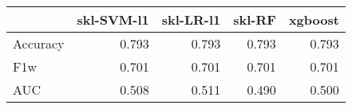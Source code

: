 \begin{tabular}{lrrrr}
\toprule
{} &  skl-SVM-l1 &  skl-LR-l1 &  skl-RF &  xgboost \\
\midrule
Accuracy &       0.793 &      0.793 &   0.793 &    0.793 \\
F1w      &       0.701 &      0.701 &   0.701 &    0.701 \\
AUC      &       0.508 &      0.511 &   0.490 &    0.500 \\
\bottomrule
\end{tabular}
